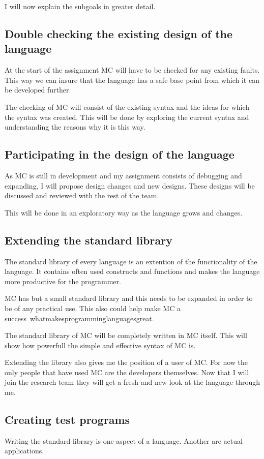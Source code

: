 I will now explain the subgoals in greater detail.

\subsection{Double checking the existing design of the language}
At the start of the assignment MC will have to be checked for any existing faults.
This way we can insure that the language has a safe base point from which it can be developed further.

The checking of MC will consist of the existing syntax and the ideas for which the syntax was created.
This will be done by exploring the current syntax and understanding the reasons why it is this way.

\subsection{Participating in the design of the language}
As MC is still in development and my assignment consists of debugging and expanding, I will propose design changes and new designs.
These designs will be discussed and reviewed with the rest of the team.

This will be done in an exploratory way as the language grows and changes.

\subsection{Extending the standard library}
The standard library of every language is an extention of the functionality of the language.
It contains often used constructs and functions and makes the language more productive for the programmer.

MC has but a small standard library and this needs to be expanded in order to be of any practical use.
This also could help make MC a success~\cite{}whatmakesprogramminglanguagesgreat.

The standard library of MC will be completely written in MC itself.
This will show how powerfull the simple and effective syntax of MC is.

Extending the library also gives me the position of a user of MC.
For now the only people that have used MC are the developers themselves.
Now that I will join the research team they will get a fresh and new look at the language through me.

\subsection{Creating test programs}
Writing the standard library is one aspect of a language.
Another are actual applications.

